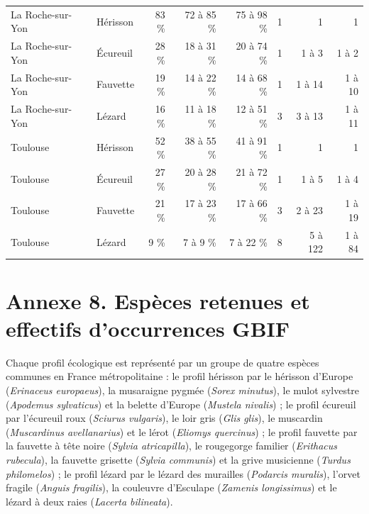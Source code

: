 \documentclass[a4paper,12pt]{report}
\begin{document}
\begin{table}[H]
\begin{tabular}{@{}llrrrrrr@{}}
La Roche-sur-Yon & Hérisson & 83 \% & 72 à 85 \% & 75 à 98 \% & 1 & 1 & 1 \\
La Roche-sur-Yon & Écureuil & 28 \% & 18 à 31 \% & 20 à 74 \% & 1 & 1 à 3 & 1 à 2 \\
La Roche-sur-Yon & Fauvette & 19 \% & 14 à 22 \% & 14 à 68 \% & 1 & 1 à 14 & 1 à 10 \\
La Roche-sur-Yon & Lézard & 16 \% & 11 à 18 \% & 12 à 51 \% & 3 & 3 à 13 & 1 à 11 \\
Toulouse & Hérisson & 52 \% & 38 à 55 \% & 41 à 91 \% & 1 & 1 & 1 \\
Toulouse & Écureuil & 27 \% & 20 à 28 \% & 21 à 72 \% & 1 & 1 à 5 & 1 à 4 \\
Toulouse & Fauvette & 21 \% & 17 à 23 \% & 17 à 66 \% & 3 & 2 à 23 & 1 à 19 \\
Toulouse & Lézard & 9 \% & 7 à 9 \% & 7 à 22 \% & 8 & 5 à 122 & 1 à 84 \\
\bottomrule
\end{tabular}
\end{table}

\section*{Annexe 8. Espèces retenues et effectifs d'occurrences GBIF}
{}

Chaque profil écologique est représenté par un groupe de quatre espèces communes en France métropolitaine : le profil hérisson par le hérisson d'Europe (\textit{Erinaceus europaeus}), la musaraigne pygmée (\textit{Sorex minutus}), le mulot sylvestre (\textit{Apodemus sylvaticus}) et la belette d'Europe (\textit{Mustela nivalis}) ; le profil écureuil par l'écureuil roux (\textit{Sciurus vulgaris}), le loir gris (\textit{Glis glis}), le muscardin (\textit{Muscardinus avellanarius}) et le lérot (\textit{Eliomys quercinus}) ; le profil fauvette par la fauvette à tête noire (\textit{Sylvia atricapilla}), le rougegorge familier (\textit{Erithacus rubecula}), la fauvette grisette (\textit{Sylvia communis}) et la grive musicienne (\textit{Turdus philomelos}) ; le profil lézard par le lézard des murailles (\textit{Podarcis muralis}), l'orvet fragile (\textit{Anguis fragilis}), la couleuvre d'Esculape (\textit{Zamenis longissimus}) et le lézard à deux raies (\textit{Lacerta bilineata}).
\end{document}
